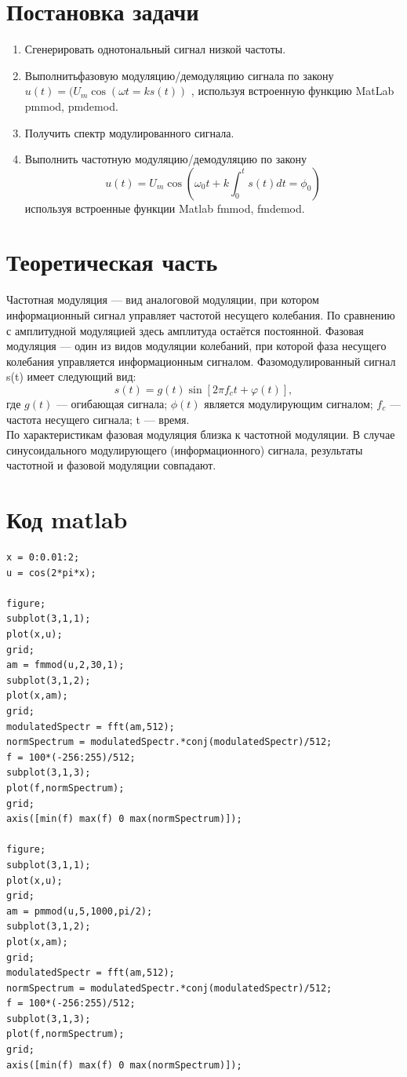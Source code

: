\documentclass[10pt,a4paper]{report}
\begin{document}
\section{Постановка задачи}
\begin{enumerate}
\item 
Сгенерировать однотональный сигнал низкой частоты.
\item
Выполнитьфазовую модуляцию/демодуляцию сигнала по закону $u(t)=(U_m\cos(\omega t=ks(t))$ , используя встроенную функцию MatLab pmmod, pmdemod.
\item
Получить спектр модулированного сигнала.
\item
Выполнить частотную модуляцию/демодуляцию по закону 
\begin{equation}
u(t)=U_m\cos (\omega _0 t+k \int_0^t s(t)dt=\phi _0)
\end{equation}
используя встроенные функции Matlab fmmod, fmdemod.
\end{enumerate}
\section{Теоретическая часть}
Частотная модуляция — вид аналоговой модуляции, при котором информационный сигнал управляет частотой несущего колебания. По сравнению с амплитудной модуляцией здесь амплитуда остаётся постоянной.\newline
Фазовая модуляция — один из видов модуляции колебаний, при которой фаза несущего колебания управляется информационным сигналом. Фазомодулированный сигнал s(t) имеет следующий вид:
\begin{equation} 
s(t) = g(t) \sin[2 \pi f_c t + \varphi(t)] ,
\end{equation}
где $g(t)$ — огибающая сигнала; $\phi(t)$ является модулирующим сигналом; $f_c$ — частота несущего сигнала; t — время.\\
По характеристикам фазовая модуляция близка к частотной модуляции. В случае синусоидального модулирующего (информационного) сигнала, результаты частотной и фазовой модуляции совпадают.
\section{Код matlab}
\begin{verbatim}
x = 0:0.01:2;
u = cos(2*pi*x);

figure;
subplot(3,1,1);
plot(x,u);
grid;
am = fmmod(u,2,30,1);
subplot(3,1,2);
plot(x,am);
grid;
modulatedSpectr = fft(am,512);
normSpectrum = modulatedSpectr.*conj(modulatedSpectr)/512;
f = 100*(-256:255)/512;
subplot(3,1,3);
plot(f,normSpectrum);
grid;
axis([min(f) max(f) 0 max(normSpectrum)]);

figure;
subplot(3,1,1);
plot(x,u);
grid;
am = pmmod(u,5,1000,pi/2);
subplot(3,1,2);
plot(x,am);
grid;
modulatedSpectr = fft(am,512);
normSpectrum = modulatedSpectr.*conj(modulatedSpectr)/512;
f = 100*(-256:255)/512;
subplot(3,1,3);
plot(f,normSpectrum);
grid;
axis([min(f) max(f) 0 max(normSpectrum)]);
\end{verbatim}
\end{document}
